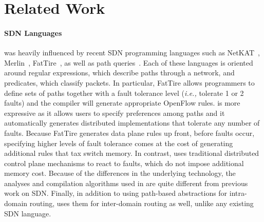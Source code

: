 \section{Related Work}
\label{sec:related}

\paragraph*{SDN Languages}
\sysname{} was heavily influenced by recent SDN programming
languages such as NetKAT~\cite{netkat}, Merlin~\cite{foster:merlin}, FatTire~\cite{fattire}, 
as well as path queries~\cite{queries}.
Each of these languages is oriented around regular expressions, which
describe paths through a network, and predicates, which classify packets.
In particular, FatTire allows programmers to define sets of paths together
with a fault tolerance level (\emph{i.e.,} tolerate 1 or 2 faults)
and the compiler will generate appropriate
OpenFlow rules.  \sysname is more
expressive as it allows users to specify preferences among
paths and it automatically generates distributed
implementations that tolerate
any number of faults.  Because FatTire generates data plane rules up front,
before faults occur, specifying higher levels of fault tolerance comes
at the cost of generating additional rules that tax switch
memory.  In contrast, \sysname uses traditional distributed
control plane mechanisms to react to faults, which do not impose
additional memory cost.
Because of the differences in the underlying technology, the analyses
and compilation algorithms used in \sysname are quite different from
previous work on SDN.  Finally, in addition to using path-based abstractions
for intra-domain routing, \sysname uses them for inter-domain routing as
well, unlike any existing SDN language.

